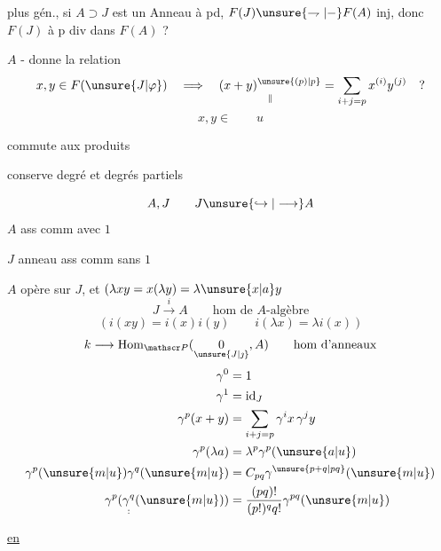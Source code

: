 
plus gén., si $A\supset J$ est un Anneau à pd,  $F(J)\unsure{\rightharpoondown|{-}}F(A)$ inj, donc $F(J)$ à p div dans $F(A)$ ?


 $A$ - donne la relation
\[
x,y\in F(\unsure{J|\varphi})\quad\Longrightarrow\quad
\underset{\Vert}{(x+y)^{\unsure{(p)|p}}}=\sum_{i+j=p}x^{(i)}y^{(j)}\quad?
\]
\[x,y\in\qquad u\]

commute aux produits\par
conserve degré et degrés partiels

\[
A,J\qquad J\unsure{\hookrightarrow|\longrightarrow} A
\]
$A$  ass comm avec $1$\par
$J$ anneau ass comm sans $1$\par
$A$ opère sur $J$, et $(\lambda xy=x(\lambda y)=\lambda\unsure{x|a}y$
\[
J\xrightarrow{i} A\qquad\text{hom de }A\text{-}\text{algèbre}
\]
\[
(i(xy)=i(x)i(y)\qquad i(\lambda x)=\lambda i(x))
\]
\[
k\longrightarrow\operatorname{Hom}_{\mathscr P}(\underset{\unsure{J|\jmath}}{0},A)\qquad\text{hom d'anneaux}
\]
\[
\begin{aligned}
\gamma^0&=1\\
\gamma^1&=\mathrm{id}_J\\
\gamma^p(x+y)&=\sum_{i+j=p}\gamma^i x\,\gamma^j y\\
\gamma^p(\lambda a)&=\lambda^p\gamma^p(\unsure{a|u})\\
\gamma^p(\unsure{m|u})\gamma^q(\unsure{m|u})&=C_{pq}\gamma^{\unsure{p+q|pq}}(\unsure{m|u})\\
\gamma^p(\underset{:}{\gamma^q}(\unsure{m|u}))&=\frac{(pq)!}{(p!)^q q!}\gamma^{pq}(\unsure{m|u})
\end{aligned}
\]

\uline{ en }

